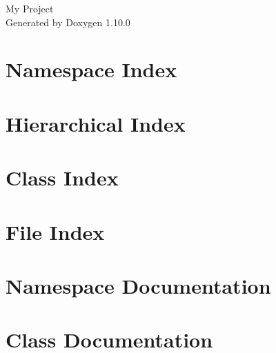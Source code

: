\documentclass[twoside]{book}
\newcommand{\+}{\discretionary{\mbox{\scriptsize$\hookleftarrow$}}{}{}}
\newcommand{\clearemptydoublepage}{%
    \newpage{\pagestyle{empty}\cleardoublepage}%
  }
\begin{document}
  \raggedbottom
    \hypersetup{pageanchor=false,
                bookmarksnumbered=true,
                pdfencoding=unicode
               }
  \begin{titlepage}
  \vspace*{7cm}
  \begin{center}%
  {\Large My Project}\\
  \vspace*{1cm}
  {\large Generated by Doxygen 1.10.0}\\
  \end{center}
  \end{titlepage}
  \clearemptydoublepage
  \tableofcontents
  \clearemptydoublepage
  \hypersetup{pageanchor=true}
\chapter{Namespace Index}

\chapter{Hierarchical Index}

\chapter{Class Index}

\chapter{File Index}

\chapter{Namespace Documentation}


\chapter{Class Documentation}
































\end{document}
